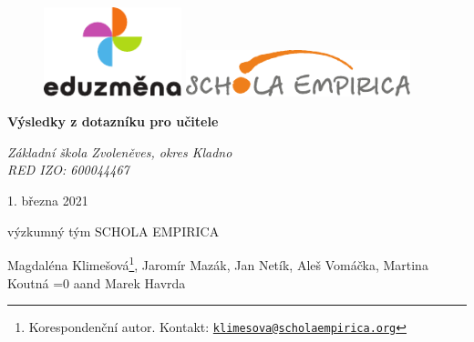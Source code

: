 \documentclass[12pt,a4paper,]{report}
\newcommand{\tr}[2]{\ifnum\pdfstrcmp{\languagename}{czech}=0 #1\else #2\fi}
\begin{document}
\begin{titlepage}
    \begin{center}

      \onehalfspacing

      \vspace*{1cm}

      \begin{figure}
      \centering
      \includegraphics[width=4cm]{logos/eduzmena}%
      \hspace{1.5cm}%
      \includegraphics[width=6.5cm]{logos/schola}%
      \end{figure}

      \vspace{1cm}

      \textbf{\huge Výsledky z dotazníku pro učitele}

      \vspace{.25cm}

      \textit{\Large Základní škola Zvoleněves, okres Kladno\\
RED IZO: 600044467}

      \vspace{1cm}

      \large

      1. března 2021

      \vspace{1cm}

      výzkumný tým SCHOLA EMPIRICA

      \vspace{.25cm}

            Magdaléna Klimešová\footnote{Korespondenční autor. Kontakt: \href{mailto:klimesova@scholaempirica.org}{\nolinkurl{klimesova@scholaempirica.org}}}, Jaromír Mazák, Jan Netík, Aleš Vomáčka, Martina Koutná \tr{a}{and} Marek Havrda

      \vspace{1.5cm}

    \end{center}
\end{titlepage}
\end{document}
